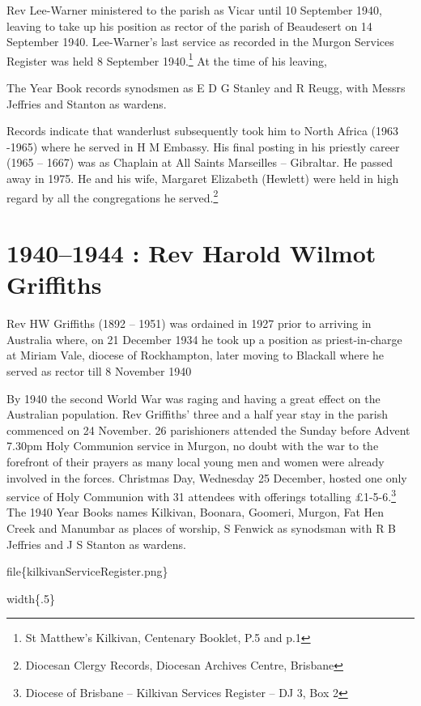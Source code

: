 Rev Lee-Warner ministered to the parish as Vicar until 10 September
1940, leaving to take up his position as rector of the parish of
Beaudesert on 14 September 1940. Lee-Warner's last service as recorded
in the Murgon Services Register was held 8 September 1940.\footnote{St
  Matthew's Kilkivan, Centenary Booklet, P.5 and p.1} At the time of his
leaving,

The Year Book records synodsmen as E D G Stanley and R Reugg, with
Messrs Jeffries and Stanton as wardens.

Records indicate that wanderlust subsequently took him to North Africa
(1963 -1965) where he served in H M Embassy. His final posting in his
priestly career (1965 -- 1667) was as Chaplain at All Saints Marseilles
-- Gibraltar. He passed away in 1975. He and his wife, Margaret
Elizabeth (Hewlett) were held in high regard by all the congregations he
served.\footnote{Diocesan Clergy Records, Diocesan Archives Centre,
  Brisbane}

\hypertarget{rev-harold-wilmot-griffiths}{%
\chapter{1940--1944 : Rev Harold Wilmot
Griffiths}\label{rev-harold-wilmot-griffiths}}

Rev HW Griffiths (1892 -- 1951) was ordained in 1927 prior to arriving
in Australia where, on 21 December 1934 he took up a position as
priest-in-charge at Miriam Vale, diocese of Rockhampton, later moving to
Blackall where he served as rector till 8 November 1940

By 1940 the second World War was raging and having a great effect on the
Australian population. Rev Griffiths' three and a half year stay in the
parish commenced on 24 November. 26 parishioners attended the Sunday
before Advent 7.30pm Holy Communion service in Murgon, no doubt with the
war to the forefront of their prayers as many local young men and women
were already involved in the forces. Christmas Day, Wednesday 25
December, hosted one only service of Holy Communion with 31 attendees
with offerings totalling £1-5-6.\footnote{Diocese of Brisbane --
  Kilkivan Services Register -- DJ 3, Box 2} The 1940 Year Books names
Kilkivan, Boonara, Goomeri, Murgon, Fat Hen Creek and Manumbar as places
of worship, S Fenwick as synodsman with R B Jeffries and J S Stanton as
wardens.

file\{kilkivanServiceRegister.png\}

width\{.5\}

